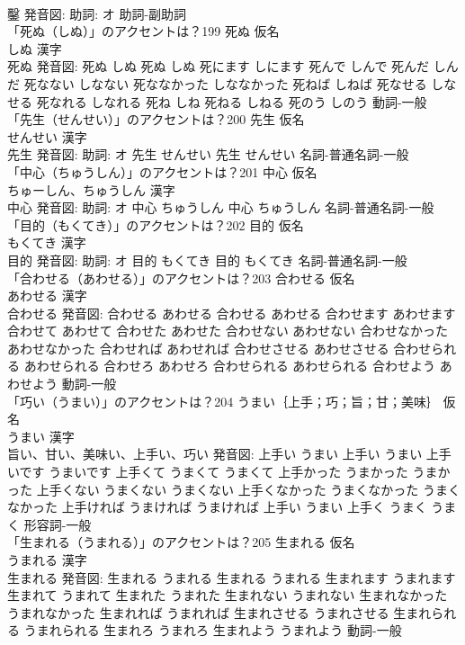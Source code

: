 \documentclass[8pt]{extreport}
\begin{document}
\begin{CJK}{UTF8}{min}
\\	鑿 発音図: 助詞: オ							助詞-副助詞 
\\	「死ぬ（しぬ）」のアクセントは？199	死ぬ 仮名　
\\	しぬ 漢字　
\\	死ぬ 発音図:	死ぬ しぬ		死ぬ しぬ 死にます しにます 死んで しんで 死んだ しんだ 死なない しなない 死ななかった しななかった 死ねば しねば 死なせる しなせる 死なれる しなれる 死ね しね 死ねる しねる 死のう しのう				動詞-一般 
\\	「先生（せんせい）」のアクセントは？200	先生 仮名　
\\	せんせい 漢字　
\\	先生 発音図: 助詞: オ	先生 せんせい		先生 せんせい				名詞-普通名詞-一般 
\\	「中心（ちゅうしん）」のアクセントは？201	中心 仮名　
\\	ちゅーしん、ちゅうしん 漢字　
\\	中心 発音図: 助詞: オ	中心 ちゅうしん		中心 ちゅうしん				名詞-普通名詞-一般 
\\	「目的（もくてき）」のアクセントは？202	目的 仮名　
\\	もくてき 漢字　
\\	目的 発音図: 助詞: オ	目的 もくてき		目的 もくてき				名詞-普通名詞-一般 
\\	「合わせる（あわせる）」のアクセントは？203	合わせる 仮名　
\\	あわせる 漢字　
\\	合わせる 発音図:	合わせる あわせる		合わせる あわせる 合わせます あわせます 合わせて あわせて 合わせた あわせた 合わせない あわせない 合わせなかった あわせなかった 合わせれば あわせれば 合わせさせる あわせさせる 合わせられる あわせられる 合わせろ あわせろ 合わせられる あわせられる 合わせよう あわせよう				動詞-一般 
\\	「巧い（うまい）」のアクセントは？204	うまい｛上手；巧；旨；甘；美味｝ 仮名　
\\	うまい 漢字　
\\	旨い、甘い、美味い、上手い、巧い 発音図:	上手い うまい		上手い うまい 上手いです うまいです 上手くて うまくて うまくて 上手かった うまかった うまかった 上手くない うまくない うまくない 上手くなかった うまくなかった うまくなかった 上手ければ うまければ うまければ 上手い うまい 上手く うまく うまく				形容詞-一般 
\\	「生まれる（うまれる）」のアクセントは？205	生まれる 仮名　
\\	うまれる 漢字　
\\	生まれる 発音図:	生まれる うまれる		生まれる うまれる 生まれます うまれます 生まれて うまれて 生まれた うまれた 生まれない うまれない 生まれなかった うまれなかった 生まれれば うまれれば 生まれさせる うまれさせる 生まれられる うまれられる 生まれろ うまれろ 生まれよう うまれよう				動詞-一般 

\end{CJK}
\end{document}
